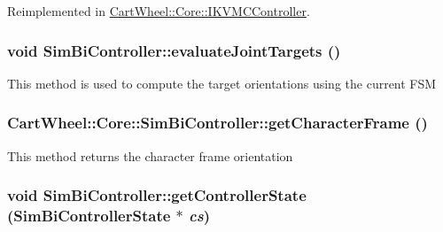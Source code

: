 Reimplemented in \hyperlink{classCartWheel_1_1Core_1_1IKVMCController_a0a944ad3c3178ecc74488c1697460883}{CartWheel::Core::IKVMCController}.

\hypertarget{classCartWheel_1_1Core_1_1SimBiController_acd7efab03c0deed76d8576d00c04e3fb}{
\subsubsection[{evaluateJointTargets}]{\setlength{\rightskip}{0pt plus 5cm}void SimBiController::evaluateJointTargets ()}}
\label{classCartWheel_1_1Core_1_1SimBiController_acd7efab03c0deed76d8576d00c04e3fb}
This method is used to compute the target orientations using the current FSM \hypertarget{classCartWheel_1_1Core_1_1SimBiController_ae649dcba302338b637d21171d4e43a71}{
\subsubsection[{getCharacterFrame}]{ CartWheel::Core::SimBiController::getCharacterFrame ()}}
\label{classCartWheel_1_1Core_1_1SimBiController_ae649dcba302338b637d21171d4e43a71}
This method returns the character frame orientation \hypertarget{classCartWheel_1_1Core_1_1SimBiController_a529c02585e22b1c824b32eb6255de87a}{
\subsubsection[{getControllerState}]{\setlength{\rightskip}{0pt plus 5cm}void SimBiController::getControllerState ({\bf SimBiControllerState} $\ast$ {\em cs})}}
\label{classCartWheel_1_1Core_1_1SimBiController_a529c02585e22b1c824b32eb6255de87a}
